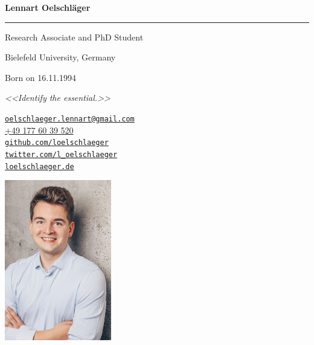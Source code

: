 \documentclass[11pt,]{article}
\begin{document}
\begin{adjustwidth}{30pt}{0pt}
\begin{multicols}{2}

\centerline{\huge \bf Lennart Oelschläger}
\vspace{2 mm}
\hrule
\vspace{2 mm}
\centerline{Research Associate and PhD Student}
\centerline{Bielefeld University, Germany}
\centerline{Born on 16.11.1994}
\vfill
\centerline{\emph{<<Identify the essential.>>}}
\vfill

\faEnvelopeO \hspace{1 mm} \href{mailto:}{\tt oelschlaeger.lennart@gmail.com} \hspace{1 mm} \\
 \faPhone \hspace{1 mm}  \href{tel:+49 177 60 39 520}{+49 177 60 39
520}  \hspace{1 mm}  \\
\faGithub \hspace{1 mm} \href{https://github.com/loelschlaeger}{\tt github.com/loelschlaeger} \hspace{1 mm}  \\
\faTwitter \hspace{1 mm} \href{https:/twitter.com/l\_oelschlaeger}{\tt twitter.com/l\_oelschlaeger} \hspace{1 mm}  \\
 \faGlobe \hspace{1 mm} \href{https://loelschlaeger.de}{\tt loelschlaeger.de} 

\columnbreak

\begin{center}
\includegraphics[height=7cm]{oelschlaeger.jpg}
\end{center}

\end{multicols}
\end{adjustwidth}
\end{document}
